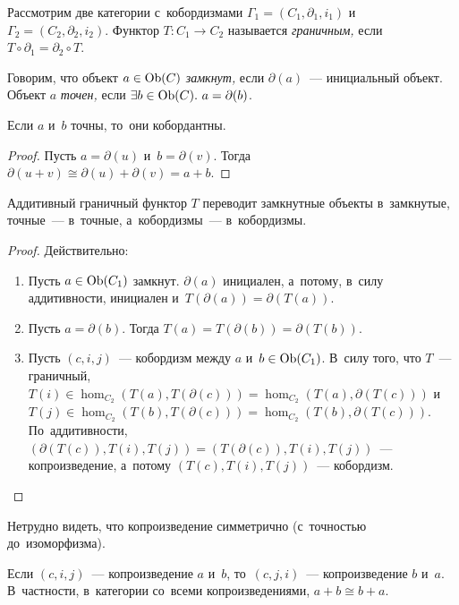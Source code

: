 \documentclass[a4paper,oneside]{article}
\begin{document}
Рассмотрим две категории с~кобордизмами $\Gamma_1 = (C_1, \partial_1, i_1)$ и~$\Gamma_2 = (C_2, \partial_2, i_2)$.
Функтор $T : C_1 \rightarrow C_2$ называется \textit{граничным,} если $T \circ \partial_1 = \partial_2 \circ T$.

Говорим, что объект $a \in \mathrm{Ob}(C)$ \textit{замкнут,} если $\partial(a)$~— инициальный объект.
Объект $a$ \textit{точен,} если $\exists b \in \mathrm{Ob}(C).\ a = \partial(b)$.

\begin{statement*}
  Если $a$ и~$b$ точны, то~они кобордантны.
\end{statement*}

\begin{proof}
  Пусть $a = \partial(u)$ и~$b = \partial(v)$. Тогда $\partial(u + v) \cong \partial(u) + \partial(v) = a + b$.
\end{proof}

\begin{statement*}
  Аддитивный граничный функтор $T$ переводит замкнутные объекты в~замкнутые, точные~— в~точные, а~кобордизмы~— в~кобордизмы.
\end{statement*}

\begin{proof}
  Действительно:
  \begin{enumerate}
    \item Пусть $a \in \mathrm{Ob}(C_1)$ замкнут. $\partial(a)$ инициален, а~потому, в~силу аддитивности,
    инициален и~$T(\partial(a)) = \partial(T(a))$.

    \item Пусть $a = \partial(b)$. Тогда $T(a) = T(\partial(b)) = \partial(T(b))$.

    \item Пусть $(c, i, j)$~— кобордизм между $a$ и~$b \in \mathrm{Ob}(C_1)$.
          В~силу того, что $T$~— граничный, $T(i) \in \hom_{C_2}(T(a), T(\partial(c))) = \hom_{C_2}(T(a), \partial(T(c)))$
          и~$T(j) \in \hom_{C_2}(T(b), T(\partial(c))) = \hom_{C_2}(T(b), \partial(T(c)))$.
          По~аддитивности, $(\partial(T(c)),\allowbreak T(i),\allowbreak T(j)) = (T(\partial(c)), T(i), T(j))$~— копроизведение,
          а~потому $(T(c),\allowbreak T(i),\allowbreak T(j))$~— кобордизм. \qedhere
  \end{enumerate}
\end{proof}

Нетрудно видеть, что копроизведение симметрично (с~точностью до~изоморфизма).

\begin{statement*}
  Если $(c, i, j)$~— копроизведение $a$ и~$b$, то~$(c, j, i)$~— копроизведение $b$ и~$a$.
  В~частности, в~категории со~всеми копроизведениями, $a + b \cong b + a$.
\end{statement*}
\end{document}

